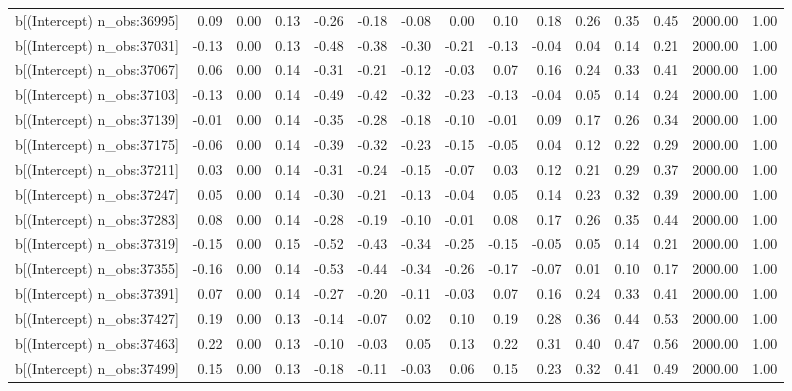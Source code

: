 \begin{table}[ht]
\begin{tabular}{rrrrrrrrrrrrrrr}
  b[(Intercept) n\_obs:36995] & 0.09 & 0.00 & 0.13 & -0.26 & -0.18 & -0.08 & 0.00 & 0.10 & 0.18 & 0.26 & 0.35 & 0.45 & 2000.00 & 1.00 \\ 
  b[(Intercept) n\_obs:37031] & -0.13 & 0.00 & 0.13 & -0.48 & -0.38 & -0.30 & -0.21 & -0.13 & -0.04 & 0.04 & 0.14 & 0.21 & 2000.00 & 1.00 \\ 
  b[(Intercept) n\_obs:37067] & 0.06 & 0.00 & 0.14 & -0.31 & -0.21 & -0.12 & -0.03 & 0.07 & 0.16 & 0.24 & 0.33 & 0.41 & 2000.00 & 1.00 \\ 
  b[(Intercept) n\_obs:37103] & -0.13 & 0.00 & 0.14 & -0.49 & -0.42 & -0.32 & -0.23 & -0.13 & -0.04 & 0.05 & 0.14 & 0.24 & 2000.00 & 1.00 \\ 
  b[(Intercept) n\_obs:37139] & -0.01 & 0.00 & 0.14 & -0.35 & -0.28 & -0.18 & -0.10 & -0.01 & 0.09 & 0.17 & 0.26 & 0.34 & 2000.00 & 1.00 \\ 
  b[(Intercept) n\_obs:37175] & -0.06 & 0.00 & 0.14 & -0.39 & -0.32 & -0.23 & -0.15 & -0.05 & 0.04 & 0.12 & 0.22 & 0.29 & 2000.00 & 1.00 \\ 
  b[(Intercept) n\_obs:37211] & 0.03 & 0.00 & 0.14 & -0.31 & -0.24 & -0.15 & -0.07 & 0.03 & 0.12 & 0.21 & 0.29 & 0.37 & 2000.00 & 1.00 \\ 
  b[(Intercept) n\_obs:37247] & 0.05 & 0.00 & 0.14 & -0.30 & -0.21 & -0.13 & -0.04 & 0.05 & 0.14 & 0.23 & 0.32 & 0.39 & 2000.00 & 1.00 \\ 
  b[(Intercept) n\_obs:37283] & 0.08 & 0.00 & 0.14 & -0.28 & -0.19 & -0.10 & -0.01 & 0.08 & 0.17 & 0.26 & 0.35 & 0.44 & 2000.00 & 1.00 \\ 
  b[(Intercept) n\_obs:37319] & -0.15 & 0.00 & 0.15 & -0.52 & -0.43 & -0.34 & -0.25 & -0.15 & -0.05 & 0.05 & 0.14 & 0.21 & 2000.00 & 1.00 \\ 
  b[(Intercept) n\_obs:37355] & -0.16 & 0.00 & 0.14 & -0.53 & -0.44 & -0.34 & -0.26 & -0.17 & -0.07 & 0.01 & 0.10 & 0.17 & 2000.00 & 1.00 \\ 
  b[(Intercept) n\_obs:37391] & 0.07 & 0.00 & 0.14 & -0.27 & -0.20 & -0.11 & -0.03 & 0.07 & 0.16 & 0.24 & 0.33 & 0.41 & 2000.00 & 1.00 \\ 
  b[(Intercept) n\_obs:37427] & 0.19 & 0.00 & 0.13 & -0.14 & -0.07 & 0.02 & 0.10 & 0.19 & 0.28 & 0.36 & 0.44 & 0.53 & 2000.00 & 1.00 \\ 
  b[(Intercept) n\_obs:37463] & 0.22 & 0.00 & 0.13 & -0.10 & -0.03 & 0.05 & 0.13 & 0.22 & 0.31 & 0.40 & 0.47 & 0.56 & 2000.00 & 1.00 \\ 
  b[(Intercept) n\_obs:37499] & 0.15 & 0.00 & 0.13 & -0.18 & -0.11 & -0.03 & 0.06 & 0.15 & 0.23 & 0.32 & 0.41 & 0.49 & 2000.00 & 1.00 \\ 

\end{tabular}
\end{table}
